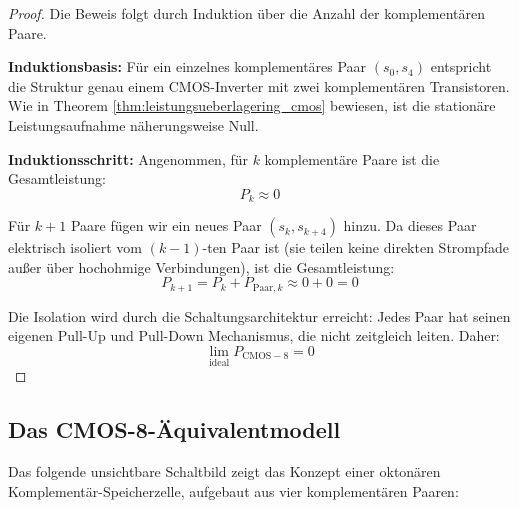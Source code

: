 \documentclass[12pt, a4paper]{article}
\theoremstyle{definition}
\theoremstyle{remark}
\begin{document}
\begin{proof}
Die Beweis folgt durch Induktion über die Anzahl der komplementären Paare.

\textbf{Induktionsbasis:} Für ein einzelnes komplementäres Paar $(s_0, s_4)$ entspricht die Struktur genau einem CMOS-Inverter mit zwei komplementären Transistoren. Wie in Theorem \ref{thm:leistungsueberlagering_cmos} bewiesen, ist die stationäre Leistungsaufnahme näherungsweise Null.

\textbf{Induktionsschritt:} Angenommen, für $k$ komplementäre Paare ist die Gesamtleistung:
\[
P_{k} \approx 0
\]

Für $k+1$ Paare fügen wir ein neues Paar $(s_k, s_{k+4})$ hinzu. Da dieses Paar elektrisch isoliert vom $(k-1)$-ten Paar ist (sie teilen keine direkten Strompfade außer über hochohmige Verbindungen), ist die Gesamtleistung:
\[
P_{k+1} = P_k + P_{\text{Paar},k} \approx 0 + 0 = 0
\]

Die Isolation wird durch die Schaltungsarchitektur erreicht: Jedes Paar hat seinen eigenen Pull-Up und Pull-Down Mechanismus, die nicht zeitgleich leiten. Daher:
\[
\lim_{\text{ideal}} P_{\mathrm{CMOS-8}} = 0
\]
\end{proof}

\subsection{Das CMOS-8-Äquivalentmodell}
\label{subsec:schaltungstechnik_cmos8}

Das folgende unsichtbare Schaltbild zeigt das Konzept einer oktonären Komplementär-Speicherzelle, aufgebaut aus vier komplementären Paaren:

  
  
  
  
\end{document}
